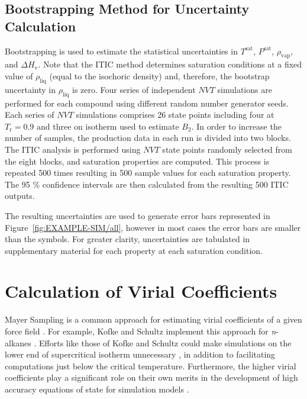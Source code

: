 \documentclass[5p,times]{elsarticle}
\begin{document}

\subsection{Bootstrapping Method for Uncertainty Calculation}\label{sec:bootstrapping}
Bootstrapping is used to estimate the statistical uncertainties \cite{Efron1981} in $T^\mathrm{sat}$, $P^\mathrm{sat}$, $\rho_\mathrm{vap}$, and $\Delta H_\mathrm{v}$. Note that the ITIC method determines saturation conditions at a fixed value of $\rho_{\mathrm{liq}}$ (equal to the isochoric density) and, therefore, the bootstrap uncertainty in $\rho_{\mathrm{liq}}$ is zero. Four series of independent $NVT$ simulations are performed for each compound using different random number generator seeds. Each series of $NVT$ simulations comprises 26 state points including four at $T_\mathrm{r}=0.9$ and three on isotherm used to estimate $B_2$. In order to increase the number of samples, the production data in each run is divided into two blocks. The ITIC analysis is performed using $NVT$ state points randomly selected from the eight blocks, and saturation properties are computed. This process is repeated 500 times resulting in 500 sample values for each saturation property. The 95 \% confidence intervals are then calculated from the resulting 500 ITIC outputs. 

The resulting uncertainties are used to generate error bars represented in Figure~\ref{fig:EXAMPLE-SIM/all}, however in most cases the error bars are smaller than the symbols. For greater clarity, uncertainties are tabulated in supplementary material for each property at each saturation condition.

\section{Calculation of Virial Coefficients} \label{sec:VirialCalc}
Mayer Sampling is a common approach for estimating virial coefficients of a given force field \cite{singh2004mayer}. For example, Kofke and Schultz implement this approach for \textit{n}-alkanes \cite{Schultz2010a}. Efforts like those of Kofke and Schultz could make simulations on the lower end of supercritical isotherm unnecessary \cite{barlow2015communication}, in addition to facilitating computations just below the critical temperature.  Furthermore, the higher virial coefficients play a significant role on their own merits in the development of high accuracy equations of state for simulation models \cite{thol2016equation}.
\end{document}
